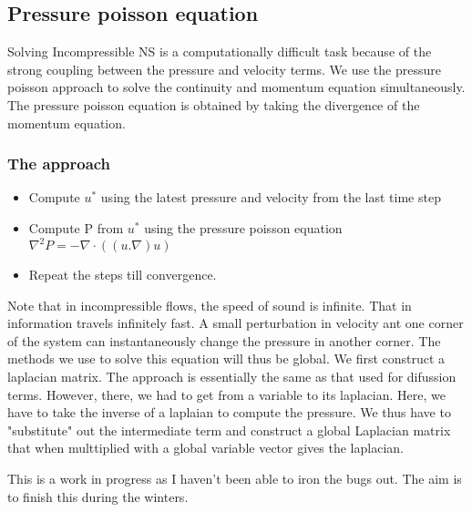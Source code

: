 \documentclass[11pt]{article}
\providecommand{\tightlist}{%
      \setlength{\itemsep}{0pt}\setlength{\parskip}{0pt}}
\begin{document}
    \subsection{Pressure poisson equation}\label{pressure-poisson-equation}

Solving Incompressible NS is a computationally difficult task because of
the strong coupling between the pressure and velocity terms. We use the
pressure poisson approach to solve the continuity and momentum equation
simultaneously. The pressure poisson equation is obtained by taking the
divergence of the momentum equation.

\subsubsection{The approach}\label{the-approach}

\begin{itemize}
\tightlist
\item
    Compute \(u^*\) using the latest pressure and velocity from the
  last time step
\item
  Compute P from \(u^*\) using the pressure poisson equation
  \(\nabla^2 P = - \nabla \cdot ((u.\nabla)u)\)
\item
  Repeat the steps till convergence.
\end{itemize}

Note that in incompressible flows, the speed of sound is infinite. That
in information travels infinitely fast. A small perturbation in velocity
ant one corner of the system can instantaneously change the pressure in
another corner. The methods we use to solve this equation will thus be
global. We first construct a laplacian matrix. The approach is
essentially the same as that used for difussion terms. However, there,
we had to get from a variable to its laplacian. Here, we have to take
the inverse of a laplaian to compute the pressure. We thus have to
"substitute" out the intermediate term and construct a global Laplacian
matrix that when multtiplied with a global variable vector gives the
laplacian.

This is a work in progress as I haven't been able to iron the bugs out.
The aim is to finish this during the winters.


    
    
    
    
\end{document}
